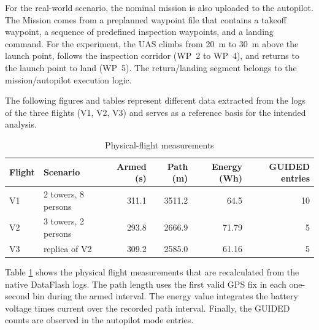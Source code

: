 \documentclass[electronics,article,submit,moreauthors]{Definitions/mdpi}
\DeclareRobustCommand{\added}[1]{#1}%
\DeclareRobustCommand{\added}[1]{\textcolor{green!50!black}{#1}}
\def\added#1{#1}%
\begin{document}
For the real-world scenario, the nominal mission is also uploaded to the autopilot. The Mission comes from a preplanned waypoint file that contains a takeoff waypoint, a sequence of predefined inspection waypoints, and a landing command. For the experiment, the UAS climbs from 20~m to 30~m above the launch point, follows the inspection corridor (WP~2 to WP~4), and returns to the launch point to land (WP~5). \added{The return/landing segment belongs to the mission/autopilot execution logic.}

\added{The following figures and tables represent different data extracted from the logs of the three flights (V1, V2, V3) and serves as a reference basis for the intended analysis. }


\begin{table}[H]
\centering
\caption{\added{Physical-flight measurements}}
\label{tab:physical_flight_summary}
\small
\begin{tabular}{llrrrr}
\toprule
\textbf{Flight} & \textbf{Scenario} & \textbf{Armed (s)} & \textbf{Path (m)} & \textbf{Energy (Wh)} & \textbf{GUIDED entries}\\
\midrule
\added{V1} & \added{2 towers, 8 persons} & \added{311.1} & \added{3511.2} & \added{64.5} & \added{10}\\
\added{V2} & \added{3 towers, 2 persons} & \added{293.8} & \added{2666.9} & \added{71.79} & \added{5}\\
\added{V3} & \added{replica of V2} & \added{309.2} & \added{2585.0} & \added{61.16} & \added{5}\\
\bottomrule
\end{tabular}
\end{table}

\added{Table \ref{tab:physical_flight_summary} shows the physical flight measurements that are recalculated from the native DataFlash logs. The path length uses the first valid GPS fix in each one-second bin during the armed interval. The energy value integrates the battery voltage times current over the recorded path interval. Finally, the GUIDED counts are observed in the autopilot mode entries. }
\end{document}
